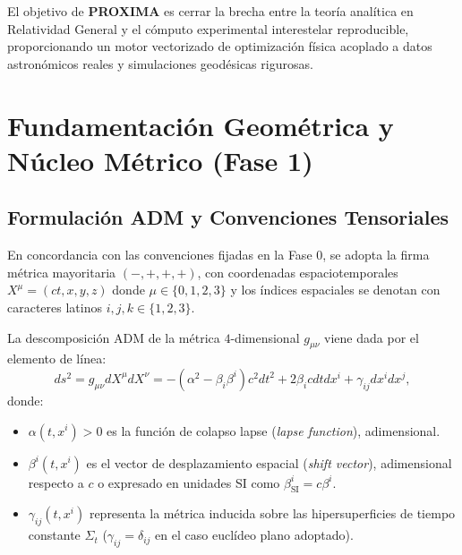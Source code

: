 \documentclass[11pt,a4paper]{article}
\begin{document}
El objetivo de \textbf{PROXIMA} es cerrar la brecha entre la teoría analítica en Relatividad General y el cómputo experimental interestelar reproducible, proporcionando un motor vectorizado de optimización física acoplado a datos astronómicos reales y simulaciones geodésicas rigurosas.

\section{Fundamentación Geométrica y Núcleo Métrico (Fase 1)}

\subsection{Formulación ADM y Convenciones Tensoriales}
En concordancia con las convenciones fijadas en la Fase 0, se adopta la firma métrica mayoritaria $(-, +, +, +)$, con coordenadas espaciotemporales $X^\mu = (c t, x, y, z)$ donde $\mu \in \{0, 1, 2, 3\}$ y los índices espaciales se denotan con caracteres latinos $i, j, k \in \{1, 2, 3\}$.

La descomposición ADM de la métrica $4$-dimensional $g_{\mu\nu}$ viene dada por el elemento de línea:
\begin{equation}
    ds^2 = g_{\mu\nu} dX^\mu dX^\nu = -\left(\alpha^2 - \beta_i \beta^i\right) c^2 dt^2 + 2 \beta_i c dt dx^i + \gamma_{ij} dx^i dx^j,
\end{equation}
donde:
\begin{itemize}
    \item $\alpha(t, x^i) > 0$ es la función de colapso lapse (\textit{lapse function}), adimensional.
    \item $\beta^i(t, x^i)$ es el vector de desplazamiento espacial (\textit{shift vector}), adimensional respecto a $c$ o expresado en unidades SI como $\beta_{\text{SI}}^i = c \beta^i$.
    \item $\gamma_{ij}(t, x^i)$ representa la métrica inducida sobre las hipersuperficies de tiempo constante $\Sigma_t$ ($\gamma_{ij} = \delta_{ij}$ en el caso euclídeo plano adoptado).
\end{itemize}
\end{document}
